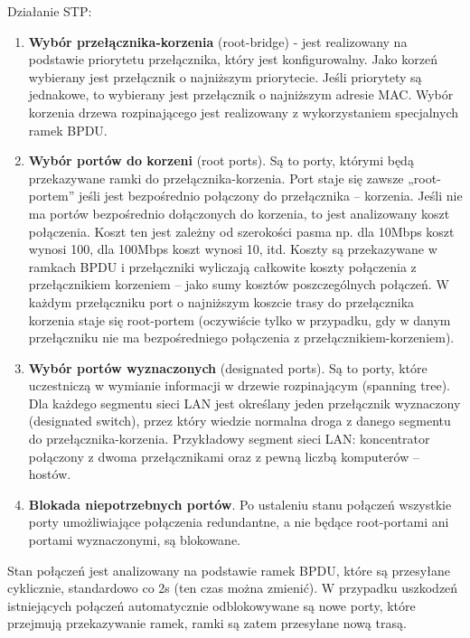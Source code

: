 \documentclass[12pt]{article}
\begin{document}
    \noindent Działanie STP:
    \begin{enumerate}
        \item \textbf{Wybór przełącznika-korzenia} (root-bridge) - jest realizowany na
        podstawie priorytetu przełącznika, który jest konfigurowalny. Jako korzeń wybierany
        jest przełącznik o najniższym priorytecie. Jeśli priorytety są jednakowe, to wybierany
        jest przełącznik o najniższym adresie MAC. Wybór korzenia drzewa rozpinającego jest
        realizowany z wykorzystaniem specjalnych ramek BPDU.
        \item \textbf{Wybór portów do korzeni} (root ports). Są to porty, którymi będą przekazywane ramki
        do przełącznika-korzenia. Port staje się zawsze „root-portem” jeśli jest bezpośrednio
        połączony do przełącznika – korzenia. Jeśli nie ma portów bezpośrednio dołączonych
        do korzenia, to jest analizowany koszt połączenia. Koszt ten jest zależny od szerokości
        pasma np. dla 10Mbps koszt wynosi 100, dla 100Mbps koszt
        wynosi 10, itd. Koszty są przekazywane w ramkach BPDU i
        przełączniki wyliczają całkowite koszty połączenia z przełącznikiem korzeniem – jako
        sumy kosztów poszczególnych połączeń. W każdym przełączniku port o najniższym
        koszcie trasy do przełącznika korzenia staje się root-portem (oczywiście tylko w
        przypadku, gdy w danym przełączniku nie ma bezpośredniego połączenia z
        przełącznikiem-korzeniem).
        \item \textbf{Wybór portów wyznaczonych} (designated ports). Są to porty, które uczestniczą
        w wymianie informacji w drzewie rozpinającym (spanning tree). Dla każdego
        segmentu sieci LAN jest określany jeden przełącznik wyznaczony (designated switch),
        przez który wiedzie normalna droga z danego segmentu do przełącznika-korzenia.
        Przykładowy segment sieci LAN: koncentrator połączony z dwoma przełącznikami
        oraz z pewną liczbą komputerów – hostów.
        \item \textbf{Blokada niepotrzebnych portów}. Po ustaleniu stanu połączeń wszystkie porty
        umożliwiające połączenia redundantne, a nie będące root-portami ani portami wyznaczonymi, są blokowane.
    \end{enumerate}

    Stan połączeń jest analizowany na podstawie ramek BPDU, które są przesyłane cyklicznie,
    standardowo co 2s (ten czas można zmienić). W przypadku uszkodzeń istniejących połączeń
    automatycznie odblokowywane są nowe porty, które przejmują przekazywanie ramek, ramki
    są zatem przesyłane nową trasą.
\end{document}
